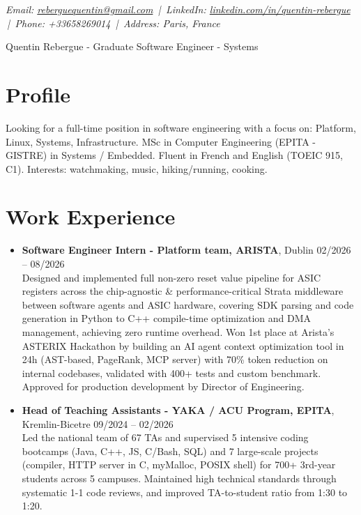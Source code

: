 \documentclass[9pt,a4paper]{article}
\newcommand{\namefont}{\fontsize{18}{22}\selectfont}
\newcommand{\tinyscript}{\fontsize{8}{8}\selectfont}
\begin{document}
\renewcommand\normalsize{\fontsize{10.5}{15}\selectfont}
\normalsize

\begin{center}
  {\tinyscript\itshape
  Email: \href{mailto:reberguequentin@gmail.com}{reberguequentin@gmail.com} \,|\,
  LinkedIn: \href{https://linkedin.com/in/quentin-rebergue}{linkedin.com/in/quentin-rebergue} \,|\,
  Phone: +33658269014 \,|\,
  Address: Paris, France}
\end{center}

\begin{center}
  {\namefont Quentin Rebergue - Graduate Software Engineer - Systems}
\end{center}

\section*{Profile}
\begin{tcolorbox}[mybox2]
Looking for a full-time position in software engineering with a focus on: Platform, Linux, Systems, Infrastructure. MSc in Computer Engineering (EPITA - GISTRE) in Systems / Embedded. Fluent in French and English (TOEIC 915, C1). Interests: watchmaking, music, hiking/running, cooking.
\end{tcolorbox}

\section*{Work Experience}
\begin{tcolorbox}[mybox]
\begin{itemize}
\item\textbf{Software Engineer Intern - Platform team, ARISTA}, Dublin \hfill {\small02/2026 – 08/2026}\\[0.5em]
\textcolor{gray!40!black}{Designed and implemented full non-zero reset value pipeline for ASIC registers across the chip-agnostic \&
performance-critical Strata middleware between software agents and ASIC hardware, covering SDK parsing and code
generation in Python to C++ compile-time optimization and DMA management, achieving zero runtime overhead. Won
1st place at Arista’s ASTERIX Hackathon by building an AI agent context optimization tool in 24h (AST-based, PageRank, MCP server) with 70\% token reduction on internal codebases, validated with 400+ tests and custom benchmark.
Approved for production development by Director of Engineering.}

\item\textbf{Head of Teaching Assistants - YAKA / ACU Program, EPITA}, Kremlin-Bicetre \hfill {\small09/2024 – 02/2026}\\[0.5em]
\textcolor{gray!40!black}{Led the national team of 67 TAs and supervised 5 intensive coding bootcamps (Java, C++, JS, C/Bash, SQL) and
7 large-scale projects (compiler, HTTP server in C, myMalloc, POSIX shell) for 700+ 3rd-year students across 5
campuses. Maintained high technical standards through systematic 1-1 code reviews, and improved TA-to-student
ratio from 1:30 to 1:20.}
\end{itemize}
\end{tcolorbox}
\end{document}

